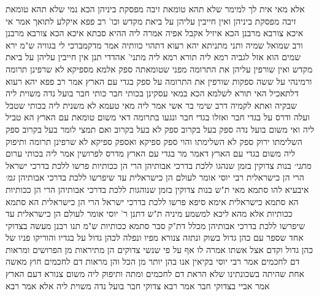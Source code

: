 \documentclass[12pt, openany]{book}
\begin{document}
{אלא מאי אית לך למימר שלא תהא טומאת זיבה מפסקת ביניהן הכא נמי שלא תהא טומאת זיבה מפסקת ביניהן
ואין חייבין עליהן על ביאת מקדש וכו' רב פפא איקלע לתואך אמר אי איכא צורבא מרבנן הכא איזיל אקבל אפיה אמרה ליה ההיא סבתא איכא הכא צורבא מרבנן ורב שמואל שמיה ותני מתניתא יהא רעוא דתהוי כוותיה 
אמר מדקמברכי לי בגוויה ש"מ ירא שמים הוא אזל לגביה רמא ליה תורא רמא ליה מתני' אהדדי תנן אין חייבין עליהן על ביאת מקדש ואין שורפין עליהן את התרומה מפני שטומאתה ספק אלמא מספיקא לא שרפינן תרומה
ורמינהי על ששה ספקות שורפין את התרומה על ספק בגדי עם הארץ 
אמר רב פפא יהא רעוא דלתאכיל האי תורא לשלמא הכא במאי עסקינן בכותי חבר 
כותי חבר בועל נדה משוית ליה 
שבקיה ואתא לקמיה דרב שימי בר אשי אמר ליה מאי טעמא לא משנית ליה בכותי שטבל ועלה ודרס על בגדי חבר ואזלו בגדי חבר ונגעו בתרומה 
דאי משום טומאת עם הארץ הא טביל ליה ואי משום בועל נדה ספק בעל בקרוב ספק לא בעל בקרוב 
ואם תמצי לומר בעל בקרוב ספק השלימתו ירוק ספק לא השלימתו והוי ספק ספיקא ואספק ספיקא לא שרפינן תרומה 
ותיפוק ליה משום בגדי עם הארץ דאמר מר בגדי עם הארץ מדרס לפרושין אמר ליה בכותי ערום
{\large\emph{מתני׳}} בנות צדוקין בזמן שנהגו ללכת בדרכי אבותיהן הרי הן ככותיות פרשו ללכת בדרכי ישראל הרי הן כישראלית רבי יוסי אומר לעולם הן כישראלית עד שיפרשו ללכת בדרכי אבותיהן
{\large\emph{גמ׳}} איבעיא להו סתמא מאי ת"ש בנות צדוקין בזמן שנוהגות ללכת בדרכי אבותיהן הרי הן ככותיות הא סתמא כישראלית אימא סיפא פרשו ללכת בדרכי ישראל הרי הן כישראלית הא סתמא ככותיות אלא מהא ליכא למשמע מיניה 
ת"ש דתנן ר' יוסי אומר לעולם הן כישראלית עד שיפרשו ללכת בדרכי אבותיהן מכלל דת"ק סבר סתמא ככותיות ש"מ
תנו רבנן מעשה בצדוקי אחד שספר עם כהן גדול בשוק ונתזה צנורא מפיו ונפלה לכהן גדול על בגדיו והוריקו פניו של כהן גדול וקדם אצל אשתו 
אמרה לו אף על פי שנשי צדוקים הן מתיראות מן הפרושים ומראות דם לחכמים 
אמר רבי יוסי בקיאין אנו בהן יותר מן הכל והן מראות דם לחכמים חוץ מאשה אחת שהיתה בשכונתינו שלא הראת דם לחכמים ומתה 
ותיפוק ליה משום צנורא דעם הארץ אמר אביי בצדוקי חבר אמר רבא צדוקי חבר בועל נדה משוית ליה אלא אמר רבא}
\end{document}
